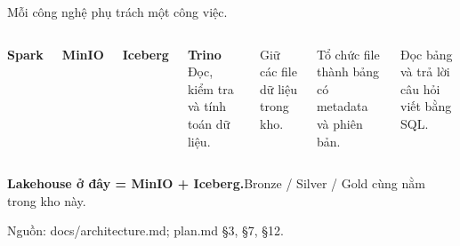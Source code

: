 \documentclass[aspectratio=169,11pt]{beamer}
\renewcommand{\small}{\fontsize{18}{24}\selectfont}
\renewcommand{\footnotesize}{\fontsize{13}{17}\selectfont}
\newcommand{\source}[1]{\vfill{\footnotesize\color{muted}Nguồn: #1\par}}
\begin{document}
\begin{frame}{Mỗi công nghệ phụ trách một công việc.}
  \begin{columns}[T,onlytextwidth]
      \textbf{Spark}\par\vspace{6mm}
      \textbf{MinIO}\par\vspace{6mm}
      \textbf{Iceberg}\par\vspace{6mm}
      \textbf{Trino}
      Đọc, kiểm tra và tính toán dữ liệu.\par\vspace{6mm}
      Giữ các file dữ liệu trong kho.\par\vspace{6mm}
      Tổ chức file thành bảng có metadata và phiên bản.\par\vspace{6mm}
      Đọc bảng và trả lời câu hỏi viết bằng SQL.
  \end{columns}
  \vspace{8mm}
  {\small\textbf{Lakehouse ở đây = MinIO + Iceberg.}\quad Bronze / Silver / Gold cùng nằm trong kho này.}
  \source{docs/architecture.md; plan.md §3, §7, §12.}
\end{frame}
\end{document}
